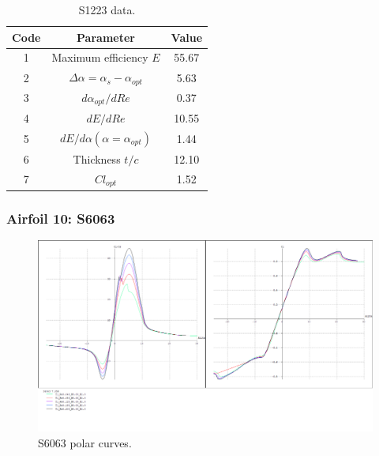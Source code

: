\documentclass[../TFG_Annex.tex]{subfiles}
\begin{document}
\begin{table}[h!]
	\centering
	\begin{tabular}{c|c|c}
		Code & Parameter                                    & Value  \\ \hline
		1    & Maximum efficiency $E$                      &      55.67         \\
		2    & $\Delta \alpha=\alpha_{s}-\alpha_{opt}$    &           5.63          \\
		3    & ${d\alpha_{opt}}/{dRe}$                     &             0.37     \\
		4    & ${dE}/{dRe}$                                &        10.55          \\
		5    & ${dE}/{d \alpha} (\alpha=\alpha_{opt})$      &           1.44        \\
		6    & Thickness $t/c$                            &              12.10      \\
		7    & $Cl_{opt}$  &   1.52
	\end{tabular}
	\caption{S1223 data.}
	\label{tab:Airf9}
\end{table}






\newpage
\subsubsection{Airfoil 10: S6063}



\begin{figure}[h!]
	\centering
	\includegraphics[width=1\linewidth]{"../../04-Airfoil selection/Imatges airfoils/10-S6063"}
	\caption{S6063 polar curves.}
	\label{fig:10-s6063}
\end{figure}
\end{document}
